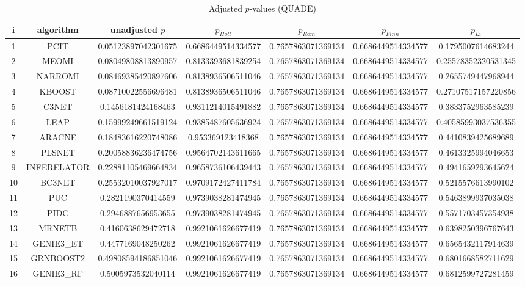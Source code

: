 \documentclass[a4paper,10pt]{article}
\begin{document}
\begin{landscape}
\begin{table}[!htp]
\centering\scriptsize
\caption{Adjusted $p$-values (QUADE)}
\begin{tabular}{ccccccc}
i&algorithm&unadjusted $p$&$p_{Holl}$&$p_{Rom}$&$p_{Finn}$&$p_{Li}$\\
\hline
1&PCIT&0.05123897042301675&0.6686449514334577&0.7657863071369134&0.6686449514334577&0.1795007614683244\\
2&MEOMI&0.08049808813890957&0.8133393681839254&0.7657863071369134&0.6686449514334577&0.25578352320531345\\
3&NARROMI&0.08469385420897606&0.8138936506511046&0.7657863071369134&0.6686449514334577&0.2655749447968944\\
4&KBOOST&0.08710022556696481&0.8138936506511046&0.7657863071369134&0.6686449514334577&0.27107517157220856\\
5&C3NET&0.1456181424168463&0.9311214015491882&0.7657863071369134&0.6686449514334577&0.3833752963585239\\
6&LEAP&0.15999249661519124&0.9385487605636924&0.7657863071369134&0.6686449514334577&0.40585993037536355\\
7&ARACNE&0.18483616220748086&0.953369123418368&0.7657863071369134&0.6686449514334577&0.4410839425689689\\
8&PLSNET&0.20058836236474756&0.9564702143611665&0.7657863071369134&0.6686449514334577&0.4613325994046653\\
9&INFERELATOR&0.22881105469664834&0.9658736106439443&0.7657863071369134&0.6686449514334577&0.4941659293645624\\
10&BC3NET&0.25532010037927017&0.9709172427411784&0.7657863071369134&0.6686449514334577&0.5215576613990102\\
11&PUC&0.2821190370414559&0.9739038281474945&0.7657863071369134&0.6686449514334577&0.5463899937035038\\
12&PIDC&0.2946887656953655&0.9739038281474945&0.7657863071369134&0.6686449514334577&0.5571703457354938\\
13&MRNETB&0.4160638629472718&0.9921061626677419&0.7657863071369134&0.6686449514334577&0.6398250396767643\\
14&GENIE3_ET&0.4477169048250262&0.9921061626677419&0.7657863071369134&0.6686449514334577&0.6565432117914639\\
15&GRNBOOST2&0.49808594186851046&0.9921061626677419&0.7657863071369134&0.6686449514334577&0.6801668582711629\\
16&GENIE3_RF&0.5005973532040114&0.9921061626677419&0.7657863071369134&0.6686449514334577&0.6812599727281459\\

\end{tabular}
\end{table}
\end{landscape}
\end{document}
